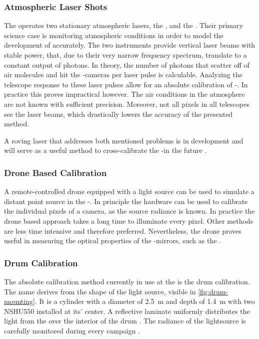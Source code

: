 \subsubsection{Atmospheric Laser Shots}

The \PAO operates two stationary atmospheric lasers, the \CLF, and the \XLF 
\cite{collaborationTechniquesMeasuringAerosol2013}. Their primary science case 
is monitoring atmospheric conditions in order to model the development of \EASs
accurately. The two instruments provide vertical laser beams with stable power,
that, due to their very narrow frequency spectrum, translate to a constant
output of photons. In theory, the number of photons that scatter off of air 
molecules and hit the \FD-cameras per laser pulse is calculable. Analyzing the
telescope response to these laser pulses allow for an absolute calibration of 
\FD-\PMTs. In practice this proves impractical however. The air conditions in 
the atmosphere are not known with sufficient precision. Moreover, not all
pixels in all telescopes see the laser beams, which drastically lowers the 
accuracy of the presented method.

A roving laser that addresses both mentioned problems is in development and 
will serve as a useful method to cross-calibrate the \FD-\PMTs in the future 
\cite{uzeiroskaAbsoluteEnergyCalibration2025}.

\subsubsection{Drone Based Calibration}

A remote-controlled drone equipped with a light source can be used to simulate 
a distant point source in the \FD-\FOV \cite{wernerDesignTestFlying2010, 
tomankovaOpticalPropertiesCalibration2016}. In principle the hardware can be
used to calibrate the individual pixels of a camera, as the source radiance is
known. In practice the drone based approach takes a long time to illuminate 
every pixel. Other methods are less time intensive and therefore preferred. 
Nevertheless, the drone proves useful in measuring the optical properties of 
the \FD-mirrors, such as the \PSF \cite{ungerSimulationPointSpread2013}.

\vspace*{5pt}
\subsubsection{Drum Calibration}
The absolute calibration method currently in use at the \PAO is the drum 
calibration. The name derives from the shape of the light source, visible in 
\cref{fig:drum-mounting}. It is a cylinder with a diameter of \SI{2.5}{\meter} 
and depth of \SI{1.4}{\meter} with two NSHU550 \UV \LEDs installed at its' 
center. A reflective laminate uniformly distributes the light from the \LED 
over the interior of the drum \cite{brackAbsolutePhotometricCalibration2004}. 
The radiance of the lightsource is carefully monitored during every \DAQ 
campaign \cite{brackAugerFluorescenceDetector2013}. 

